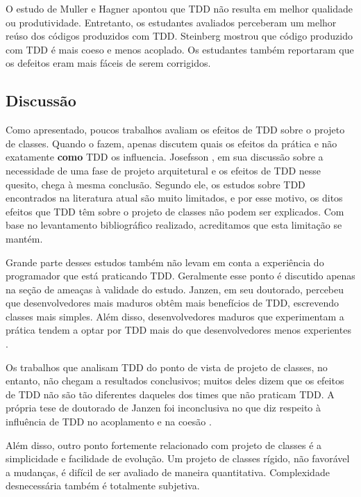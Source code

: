 \documentclass[conference]{IEEEtran}
\begin{document}
O estudo de Muller e Hagner \cite{muller-e-hagner} apontou que TDD não resulta
em melhor qualidade ou produtividade. Entretanto, os estudantes avaliados perceberam um 
melhor reúso dos códigos produzidos com TDD. Steinberg \cite{steinberg} mostrou
que código produzido com TDD é mais coeso e menos acoplado. Os estudantes também
reportaram que os defeitos eram mais fáceis de serem corrigidos. 

\subsection{Discussão}

Como apresentado, poucos trabalhos avaliam os efeitos de TDD sobre o
projeto de classes. Quando o fazem, apenas discutem quais os efeitos da prática
e não exatamente \textbf{como} TDD os influencia. Josefsson
\cite{josefsson}, em sua discussão sobre a necessidade de uma fase de projeto
arquitetural e os efeitos de TDD nesse quesito, chega à mesma conclusão. Segundo
ele, os estudos sobre TDD encontrados na literatura atual são muito limitados, e
por esse motivo, os ditos efeitos que TDD têm 
sobre o projeto de classes não podem ser explicados. Com base no levantamento
bibliográfico realizado, acreditamos que esta limitação se mantém.

Grande parte desses estudos também não levam em conta a experiência do
programador que está praticando TDD. Geralmente esse ponto é discutido apenas 
na seção de ameaças à validade do estudo. Janzen, em seu doutorado, percebeu que
desenvolvedores mais maduros obtêm mais benefícios de TDD, escrevendo classes
mais simples. Além disso, desenvolvedores maduros que experimentam a prática
tendem a optar por TDD mais do que desenvolvedores menos experientes
\cite{janzen-phd}.

Os trabalhos que analisam TDD do ponto de vista de projeto de classes, no entanto, não
chegam a resultados conclusivos; muitos deles dizem que os efeitos
de TDD não são tão diferentes daqueles dos times que não praticam TDD.  A própria tese de
doutorado de Janzen foi inconclusiva no que diz respeito à influência de TDD no 
acoplamento e na coesão \cite{janzen-phd}. 

Além disso, outro ponto fortemente relacionado com projeto de classes é a simplicidade e
facilidade de evolução. Um projeto de classes rígido, não favorável a mudanças,  é difícil de ser 
avaliado de maneira quantitativa. Complexidade
desnecessária também é totalmente subjetiva. 
\end{document}

